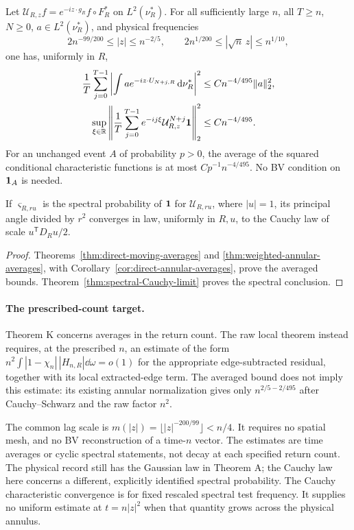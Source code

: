 \begin{maintheorem}
\label{thm:intro-direct-annular-averages}
Let $\mathcal U_{R,z}f=e^{-iz\cdot g_R}f\circ F_R^*$ on
$L^2(\nu_R^*)$. For all sufficiently large $n$, all $T\ge n$,
$N\ge0$, $a\in L^2(\nu_R^*)$, and physical frequencies
\[
 2n^{-99/200}\le|z|\le n^{-2/5},
 \qquad 2n^{1/200}\le|\sqrt n\,z|\le n^{1/10},
\]
one has, uniformly in $R$,
\begin{align*}
 \frac1T\sum_{j=0}^{T-1}
 \left|\int a e^{-iz\cdot U_{N+j,R}}\,\mathrm d\nu_R^*\right|^2
                          &\le C n^{-4/495}\|a\|_2^2,\\
 \sup_{\xi\in\mathbb R}
 \left\|\frac1T\sum_{j=0}^{T-1}
         e^{-ij\xi}\mathcal U_{R,z}^{N+j}\mathbf1\right\|_2^2
                          &\le C n^{-4/495}.
\end{align*}
For an unchanged event $A$ of probability $p>0$, the average of the
squared conditional characteristic functions is at most
$C p^{-1}n^{-4/495}$. No BV condition on $\mathbf1_A$ is needed.

If $\varsigma_{R,ru}$ is the spectral probability of $\mathbf1$ for
$\mathcal U_{R,ru}$, where $|u|=1$, its principal angle divided by
$r^2$ converges in law, uniformly in $R,u$, to the Cauchy law of scale
$u^{\mathsf T}D_Ru/2$.
\end{maintheorem}
\begin{proof}
Theorems~\ref{thm:direct-moving-averages} and
\ref{thm:weighted-annular-averages}, with
Corollary~\ref{cor:direct-annular-averages}, prove the averaged bounds.
Theorem~\ref{thm:spectral-Cauchy-limit} proves the spectral conclusion.
\end{proof}

\paragraph{The prescribed-count target.}
Theorem K concerns averages in the return count. The raw local theorem
instead requires, at the prescribed $n$, an estimate of the form
$n^2\int|1-\chi_n|\,|H_{n,R}|\dd\omega=o(1)$ for the appropriate
edge-subtracted residual, together with its local extracted-edge term.
The averaged bound does not imply this estimate: its existing annular
normalization gives only $n^{2/5-2/495}$ after Cauchy--Schwarz and the
raw factor $n^2$.

The common lag scale is $m(|z|)=\lfloor|z|^{-200/99}\rfloor<n/4$.
It requires no spatial mesh, and no BV reconstruction of a time-$n$
vector. The estimates are time averages or cyclic spectral statements,
not decay at each specified return count. The physical record still has
the Gaussian law in Theorem A; the Cauchy law here concerns a different,
explicitly identified spectral probability.
The Cauchy characteristic convergence is for fixed rescaled spectral
test frequency. It supplies no uniform estimate at $t=n|z|^2$
when that quantity grows across the physical annulus.

